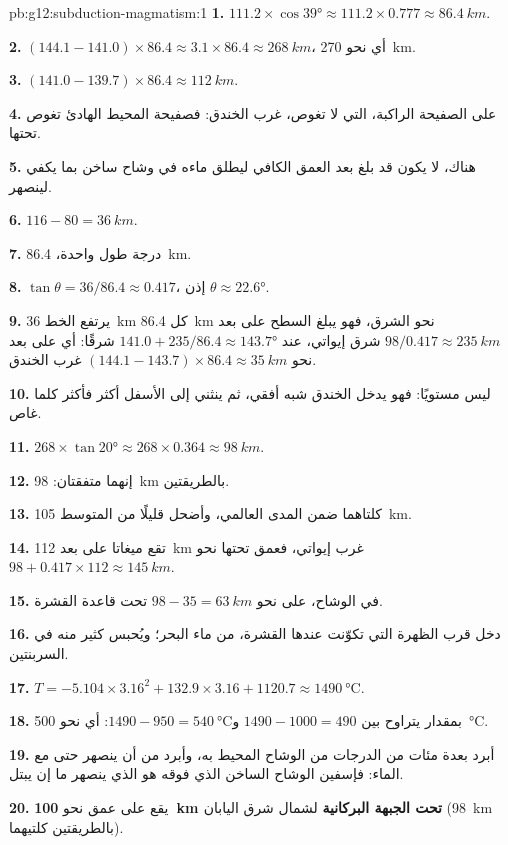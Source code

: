 \begin{solution}{pb:g12:subduction-magmatism:1}
\textbf{1.} $111.2 \times \cos\ang{39} \approx 111.2 \times 0.777 \approx
\qty{86.4}{km}$.

\textbf{2.} $(144.1 - 141.0) \times 86.4 \approx 3.1 \times 86.4 \approx
\qty{268}{km}$، أي نحو \qty{270}{km}.

\textbf{3.} $(141.0 - 139.7) \times 86.4 \approx \qty{112}{km}$.

\textbf{4.} على الصفيحة الراكبة، التي لا تغوص، غرب
الخندق: فصفيحة المحيط الهادئ تغوص تحتها.

\textbf{5.} هناك، لا يكون  قد بلغ بعد العمق الكافي ليطلق ماءه في
وشاح ساخن بما يكفي لينصهر.

\textbf{6.} $116 - 80 = \qty{36}{km}$.

\textbf{7.} درجة طول واحدة، \qty{86.4}{km}.

\textbf{8.} $\tan\theta = 36/86.4 \approx 0.417$، إذن $\theta \approx
\ang{22.6}$.

\textbf{9.} يرتفع الخط \qty{36}{km} كل \qty{86.4}{km} نحو الشرق، فهو
يبلغ السطح على بعد $98/0.417 \approx \qty{235}{km}$ شرق إيواتي، عند
$141.0 + 235/86.4 \approx \ang{143.7}$ شرقًا: أي على بعد نحو $(144.1 - 143.7) \times 86.4
\approx \qty{35}{km}$ غرب الخندق.

\textbf{10.}  ليس مستويًا: فهو يدخل الخندق شبه
أفقي، ثم ينثني إلى الأسفل أكثر فأكثر كلما غاص.

\textbf{11.} $268 \times \tan\ang{20} \approx 268 \times 0.364 \approx
\qty{98}{km}$.

\textbf{12.} إنهما متفقتان: \qty{98}{km} بالطريقتين.

\textbf{13.} كلتاهما ضمن المدى العالمي، وأضحل قليلًا من
المتوسط \qty{105}{km}.

\textbf{14.} تقع ميغاتا على بعد \qty{112}{km} غرب إيواتي، فعمق  تحتها
نحو $98 + 0.417 \times 112 \approx \qty{145}{km}$.

\textbf{15.} في الوشاح، على نحو $98 - 35 = \qty{63}{km}$ تحت قاعدة
القشرة.

\textbf{16.} دخل قرب الظهرة التي تكوّنت عندها القشرة، من ماء
البحر؛ ويُحبس كثير منه في السربنتين.

\textbf{17.} $T = -5.104 \times 3.16^2 + 132.9 \times 3.16 + 1120.7 \approx
\qty{1490}{\celsius}$.

\textbf{18.} بمقدار يتراوح بين $1490 - 1000 = 490$ و$1490 - 950 = \qty{540}{\celsius}$:
أي نحو \qty{500}{\celsius}.

\textbf{19.}  أبرد بعدة مئات من الدرجات من الوشاح
المحيط به، وأبرد من أن ينصهر حتى مع الماء: فإسفين الوشاح الساخن الذي فوقه
هو الذي ينصهر ما إن يبتل.

\textbf{20.} يقع  على عمق نحو \textbf{\qty{100}{km} تحت الجبهة
البركانية} لشمال شرق اليابان (\qty{98}{km} بالطريقتين كلتيهما).
\end{solution}
